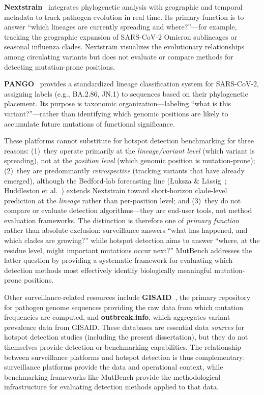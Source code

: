 \textbf{Nextstrain}~\cite{nextstrain2018hadfield} integrates phylogenetic analysis with geographic and temporal metadata to track pathogen evolution in real time. Its primary function is to answer ``which lineages are currently spreading and where?''---for example, tracking the geographic expansion of SARS-CoV-2 Omicron sublineages or seasonal influenza clades. Nextstrain visualizes the evolutionary relationships among circulating variants but does not evaluate or compare methods for detecting mutation-prone positions.

\textbf{PANGO}~\cite{rambaut2020pangolin} provides a standardized lineage classification system for SARS-CoV-2, assigning labels (e.g., BA.2.86, JN.1) to sequences based on their phylogenetic placement. Its purpose is taxonomic organization---labeling ``what is this variant?''---rather than identifying which genomic positions are likely to accumulate future mutations of functional significance.

These platforms cannot substitute for hotspot detection benchmarking for three reasons:
(1)~they operate primarily at the \textit{lineage/variant level} (which variant is spreading), not at the \textit{position level} (which genomic position is mutation-prone);
(2)~they are predominantly \textit{retrospective} (tracking variants that have already emerged), although the Bedford-lab forecasting line (Łuksza \& Lässig~\cite{luksza2014predictive}; Huddleston et al.~\cite{huddleston2020integrating}) extends Nextstrain toward short-horizon clade-level prediction at the \emph{lineage} rather than per-position level;
and (3)~they do not compare or evaluate detection algorithms---they are end-user tools, not method evaluation frameworks.
The distinction is therefore one of \emph{primary function} rather than absolute exclusion: surveillance answers ``what has happened, and which clades are growing?'' while hotspot detection aims to answer ``where, at the residue level, might important mutations occur next?''
MutBench addresses the latter question by providing a systematic framework for evaluating which detection methods most effectively identify biologically meaningful mutation-prone positions.

Other surveillance-related resources include \textbf{GISAID}~\cite{shu2017gisaid}, the primary repository for pathogen genome sequences providing the raw data from which mutation frequencies are computed, and \textbf{outbreak.info}, which aggregates variant prevalence data from GISAID.
These databases are essential data \textit{sources} for hotspot detection studies (including the present dissertation), but they do not themselves provide detection or benchmarking capabilities.
The relationship between surveillance platforms and hotspot detection is thus complementary: surveillance platforms provide the data and operational context, while benchmarking frameworks like MutBench provide the methodological infrastructure for evaluating detection methods applied to that data.

